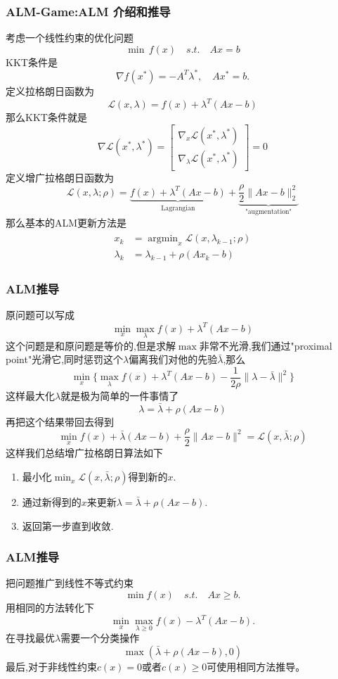 \documentclass[UTF8, aspectratio=169, 9pt]{ctexbeamer}
\begin{document}
\begin{frame}
\frametitle{ALM-Game:ALM 介绍和推导}
  考虑一个线性约束的优化问题
  $$
  \min \, f(x) \quad s.t. \quad Ax=b
  $$
  KKT条件是
  $$
  \nabla f(x^*)=- A^T \lambda^*, \quad A x^* = b.
  $$
  定义拉格朗日函数为
  $$
  \mathcal{L}(x, \lambda) = f(x) + \lambda^T (Ax-b)
  $$
  那么KKT条件就是
  $$
  \nabla \mathcal{L}(x^*, \lambda^*) =
  \begin{bmatrix}
    \nabla_x \mathcal{L}(x^*, \lambda^*) \\
    \nabla_{\lambda} \mathcal{L}(x^*, \lambda^*)
  \end{bmatrix} = 0
  $$
  定义增广拉格朗日函数为
  $$
  \mathcal{L}(x,\lambda;\rho) = \underbrace{f(x)+ \lambda^T (Ax-b)}_{\text{Lagrangian}} + \underbrace{\frac{\rho}{2} \| Ax-b \|^2_2}_{\text{"augmentation"}}
  $$
  那么基本的ALM更新方法是
  \begin{align*}
    \begin{split}
       x_k & = \mathop{\arg\min}_{x} \mathcal{L} (x, \lambda_{k-1}; \rho) \\
       \lambda_k   & = \lambda_{k-1} + \rho (A x_k -b)
    \end{split}
  \end{align*}
\end{frame}

\begin{frame}
\frametitle{ALM推导}
原问题可以写成
$$
\min_x \max_{\lambda} f(x) + \lambda^T (Ax-b)
$$
这个问题是和原问题是等价的,但是求解$\max$非常不光滑,我们通过"proximal point"光滑它,同时惩罚这个$\lambda$偏离我们对他的先验$\bar{\lambda}$,那么
$$
\min_x \big \{
\max_{\lambda} f(x) + \lambda^T (Ax-b) - \frac{1}{2 \rho} \| \lambda - \bar{\lambda} \|^2
\big \}
$$
这样最大化$\lambda$就是极为简单的一件事情了
$$
\lambda = \bar{\lambda} + \rho (Ax-b)
$$
再把这个结果带回去得到
$$
\min_x f(x) + \bar{\lambda} (Ax-b) + \frac{\rho}{2}
\| Ax -b \|^2 = \mathcal{L}(x, \bar{\lambda}; \rho)
$$
这样我们总结增广拉格朗日算法如下
\begin{enumerate}
  \item 最小化$\min_x \mathcal{L}(x, \bar{\lambda}; \rho)$得到新的$x$.
  \item 通过新得到的$x$来更新$\lambda = \bar{\lambda}+ \rho(Ax-b)$.
  \item 返回第一步直到收敛.
\end{enumerate}
\end{frame}

\begin{frame}
\frametitle{ALM推导}
把问题推广到线性不等式约束
$$
\min f(x) \quad s.t. \quad Ax \ge b.
$$
用相同的方法转化下
$$
\min_x \max_{\lambda \ge 0} f(x) - \lambda^T (Ax-b).
$$
在寻找最优$\lambda$需要一个分类操作
$$
\max (\bar{\lambda} + \rho (Ax-b), 0)
$$
最后,对于非线性约束$c(x)=0$或者$c(x) \ge 0 $可使用相同方法推导。
\end{frame}
\end{document}
